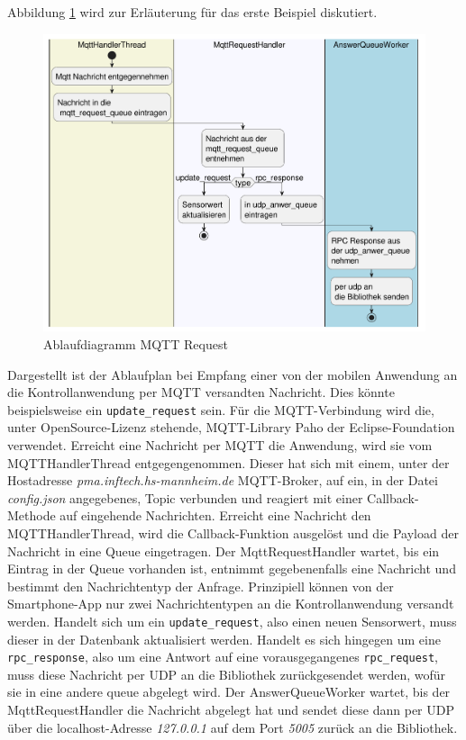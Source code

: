 \documentclass[11pt,a4paper]{report}
\begin{document}
Abbildung \ref{fig:serverMqttReqPath} wird zur Erläuterung für das erste Beispiel diskutiert.
\begin{figure}[htbp]
  \centering
  \includegraphics[width=\textwidth]{images/MqttRequestServerPath}
  \caption{Ablaufdiagramm MQTT Request}
  \label{fig:serverMqttReqPath}
\end{figure}
Dargestellt ist der Ablaufplan bei Empfang einer von der mobilen Anwendung an die Kontrollanwendung per MQTT versandten Nachricht.
Dies könnte beispielsweise ein \texttt{update\_request} sein.
Für die MQTT-Verbindung wird die, unter OpenSource-Lizenz stehende, MQTT-Library Paho \cite{paho} der Eclipse-Foundation verwendet. 
Erreicht eine Nachricht per MQTT die Anwendung, wird sie vom MQTTHandlerThread entgegengenommen.
Dieser hat sich mit einem, unter der Hostadresse \textit{pma.inftech.hs-mannheim.de} MQTT-Broker, auf ein, in der Datei \textit{config.json} angegebenes, Topic verbunden und reagiert mit einer Callback-Methode auf eingehende Nachrichten.
Erreicht eine Nachricht den MQTTHandlerThread, wird die Callback-Funktion ausgelöst und die Payload der Nachricht in eine Queue eingetragen.
Der MqttRequestHandler wartet, bis ein Eintrag in der Queue vorhanden ist, entnimmt gegebenenfalls eine Nachricht und bestimmt den Nachrichtentyp der Anfrage.
Prinzipiell können von der Smartphone-App nur zwei Nachrichtentypen an die Kontrollanwendung versandt werden.
Handelt sich um ein \texttt{update\_request}, also einen neuen Sensorwert, muss dieser in der Datenbank aktualisiert werden.
Handelt es sich hingegen um eine \texttt{rpc\_response}, also um eine Antwort auf eine vorausgegangenes \texttt{rpc\_request}, muss diese Nachricht per UDP an die Bibliothek zurückgesendet werden, wofür sie in eine andere queue abgelegt wird.
Der AnswerQueueWorker wartet, bis der MqttRequestHandler die Nachricht abgelegt hat und sendet diese dann per UDP über die localhost-Adresse \textit{127.0.0.1} auf dem Port \textit{5005} zurück an die Bibliothek.
\end{document}
